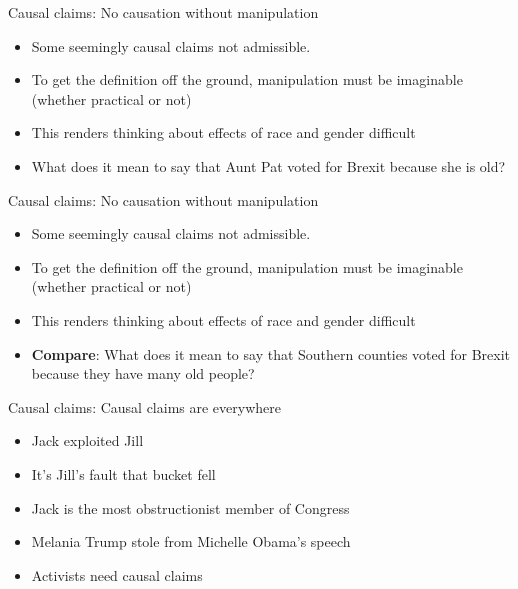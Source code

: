 \documentclass[
  11pt,
  ignorenonframetext,
]{beamer}
\providecommand{\tightlist}{%
  \setlength{\itemsep}{0pt}\setlength{\parskip}{0pt}}\usepackage{longtable,booktabs,array}
\begin{document}
\begin{frame}{Causal claims: No causation without manipulation}
\protect\hypertarget{causal-claims-no-causation-without-manipulation}{}
\begin{itemize}
\tightlist
\item
  Some seemingly causal claims not admissible.
\item
  To get the definition off the ground, manipulation must be imaginable
  (whether practical or not)
\item
  This renders thinking about effects of race and gender difficult
\item
  What does it mean to say that Aunt Pat voted for Brexit because she is
  old?
\end{itemize}
\end{frame}

\begin{frame}{Causal claims: No causation without manipulation}
\protect\hypertarget{causal-claims-no-causation-without-manipulation-1}{}
\begin{itemize}
\tightlist
\item
  Some seemingly causal claims not admissible.
\item
  To get the definition off the ground, manipulation must be imaginable
  (whether practical or not)
\item
  This renders thinking about effects of race and gender difficult
\item
  \textbf{Compare}: What does it mean to say that Southern counties
  voted for Brexit because they have many old people?
\end{itemize}
\end{frame}

\begin{frame}{Causal claims: Causal claims are everywhere}
\protect\hypertarget{causal-claims-causal-claims-are-everywhere}{}
\begin{itemize}
\item
  Jack exploited Jill
\item
  It's Jill's fault that bucket fell
\item
  Jack is the most obstructionist member of Congress
\item
  Melania Trump stole from Michelle Obama's speech
\item
  Activists need causal claims
\end{itemize}
\end{frame}
\end{document}
